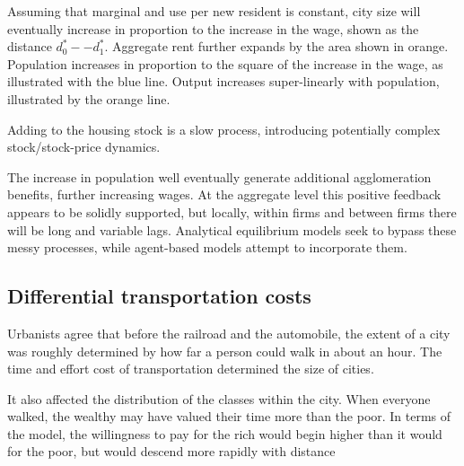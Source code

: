 Assuming that marginal and use per new resident is constant, city size will eventually increase in proportion to the increase in the wage, shown as the distance $d^*_0--d^*_1$. Aggregate rent  further expands by the area shown in orange. Population increases in proportion to the square of the increase in the wage, as illustrated with the blue line.  Output increases super-linearly with population, illustrated by the orange line. 

Adding to the  housing stock is a slow process, introducing potentially complex stock/stock-price dynamics.

The increase in population well eventually generate additional agglomeration benefits, further increasing wages. At the aggregate level this positive feedback appears to be solidly supported, but locally, within firms and between firms there will be long and variable lags. Analytical equilibrium models seek to bypass these messy processes, while agent-based models attempt to incorporate them.

\subsection{Differential transportation costs}
 Urbanists agree that before the railroad and the automobile, the extent of a city was roughly determined by how far a person could walk in about an hour. The time and effort cost of transportation determined the size of cities. 
 
 It also affected the distribution of the classes within the city. When everyone walked, the  wealthy may have valued their time more than the poor. In terms of the model, the willingness to pay for the rich would begin higher than it would for the poor, but would descend more rapidly with distance

\begin{center}
\end{center}

